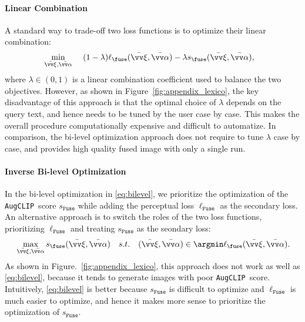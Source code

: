 \documentclass[10pt,twocolumn,letterpaper]{article}
\newcommand{\ourloss}{\texttt{AugCLIP}}
\begin{document}
\paragraph{Linear Combination} 
A standard way to trade-off two loss functions is to optimize their linear combination: 
\begin{equation}
\label{eq:linear}
\begin{aligned}
    & \min_{\bar{\vv \xi}, \bar{\vv\alpha}}~~~~(1-\lambda)\ell_{\fuse}(\bar{\vv \xi}, \bar {\vv \alpha}) - \lambda s_{\fuse}(\bar{\vv \xi}, \bar {\vv \alpha}),
\end{aligned}
\end{equation}
where $\lambda \in(0,1)$ is a linear combination coefficient used to balance the two objectives. 
However, as shown in Figure~\ref{fig:appendix_lexico}, 
the key disadvantage of this approach is that  
the optimal choice of $\lambda$ depends on 
the query text, and hence needs to be tuned by the user 
case by case. This makes the overall procedure  computationally expensive and difficult to automatize.  
In comparison, the bi-level optimization approach does not require to tune $\lambda$ case by case, and provides 
high quality fused image with only a single run. 


\paragraph{Inverse Bi-level Optimization}In the bi-level optimization in \eqref{eq:bilevel}, 
we prioritize the optimization of the 
 \ourloss~score $s_{\texttt{Fuse}}$ while adding the perceptual loss  $\ell_{\texttt{Fuse}}$  as the secondary loss. 
 An alternative approach is to switch the roles of the two loss functions, 
prioritizing $\ell_{\texttt{Fuse}}$  and treating $s_{\texttt{Fuse}}$ as the seondary loss: 
\begin{equation}
\label{eq:r-bilevel}
\begin{aligned}
    & \max_{\bar{\vv \xi}, \bar{\vv\alpha}}  s_{\fuse}(\bar{\vv \xi}, \bar {\vv \alpha})
    & s.t. ~~~ (\bar{\vv \xi}, \bar{\vv \alpha}) \in \argmin \ell_{\fuse}(\bar{\vv \xi}, \bar {\vv \alpha}).
\end{aligned}
\end{equation}
As shown in Figure.~\ref{fig:appendix_lexico},
this approach does not work as well as  \eqref{eq:bilevel}, 
because it tends to generate images with poor \ourloss~score. 
Intuitively, \eqref{eq:bilevel} is better because 
$s_{\texttt{Fuse}}$ is difficult to optimize and  
$\ell_{\texttt{Fuse}}$ is much easier to optimize, and hence it makes more sense to prioritize the optimization of $s_{\texttt{Fuse}}$. 
\vspace{.5\baselineskip}
\end{document}
